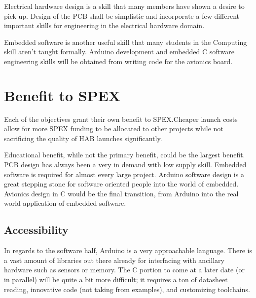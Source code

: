 \documentclass[conference]{IEEEtran} %
\begin{document}
Electrical hardware design is a skill that many members have shown a desire to
pick up. Design of the PCB shall be simplistic and incorporate a few different
important skills for engineering in the electrical hardware domain.

Embedded software is another useful skill that many students in the Computing
skill aren't taught formally. Arduino development and embedded C software
engineering skills will be obtained from writing code for the avionics board.

\section{Benefit to SPEX}
\label{sec:benefit}

Each of the objectives grant their own benefit to SPEX.\@ Cheaper launch costs
allow for more SPEX funding to be allocated to other projects while not
sacrificing the quality of HAB launches significantly.

Educational benefit, while not the primary benefit, could be the largest
benefit.  PCB design has always been a very in demand with low supply skill.
Embedded software is required for almost every large project. Arduino software
design is a great stepping stone for software oriented people into the world of
embedded. Avionics design in C would be the final transition, from Arduino into
the real world application of embedded software.


\subsection{Accessibility}
\label{subsec:plug-n-play}

In regards to the software half, Arduino is a very approachable language.  There
is a vast amount of libraries out there already for interfacing with ancillary
hardware such as sensors or memory. The C portion to come at a later date (or in
parallel) will be quite a bit more difficult; it requires a ton of datasheet
reading, innovative code (not taking from examples), and customizing toolchains.
\end{document}
